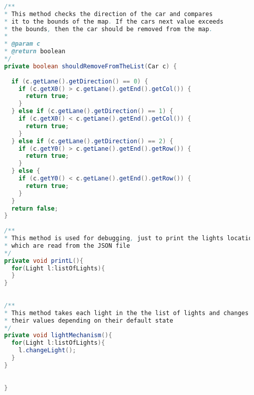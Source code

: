 \begin{lstlisting}[language=java]
  
  /**
  * This method checks the direction of the car and compares 
  * it to the bounds of the map. If the cars next value exceeds 
  * the bounds, then the car should be removed from the map. 
  * 
  * @param c
  * @return boolean
  */
  private boolean shouldRemoveFromTheList(Car c) {
    
    if (c.getLane().getDirection() == 0) {
      if (c.getX0() > c.getLane().getEnd().getCol()) {
        return true;
      }
    } else if (c.getLane().getDirection() == 1) {
      if (c.getX0() < c.getLane().getEnd().getCol()) {
        return true;
      }
    } else if (c.getLane().getDirection() == 2) {
      if (c.getY0() > c.getLane().getEnd().getRow()) {
        return true;
      }
    } else {
      if (c.getY0() < c.getLane().getEnd().getRow()) {
        return true;
      }
    }
    return false;
  }
  
  /**
  * This method is used for debugging, just to print the lights location
  * which are read from the JSON file 
  */
  private void printL(){
    for(Light l:listOfLights){
    }
  }
  
  
  /**
  * This method takes each light in the the list of lights and changes 
  * their values depending on their default state 
  */
  private void lightMechanism(){
    for(Light l:listOfLights){
      l.changeLight();
    }
  }
  
  
  }
    
\end{lstlisting}
\newpage

